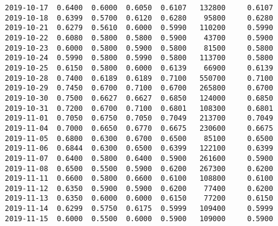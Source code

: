 \documentclass[11pt]{article}
\begin{document}
\begin{Verbatim}[commandchars=\\\{\}]
2019-10-17  0.6400  0.6000  0.6050  0.6107   132800     0.6107
2019-10-18  0.6399  0.5700  0.6120  0.6280    95800     0.6280
2019-10-21  0.6279  0.5610  0.6000  0.5990   110200     0.5990
2019-10-22  0.6080  0.5800  0.5800  0.5900    43700     0.5900
2019-10-23  0.6000  0.5800  0.5900  0.5800    81500     0.5800
2019-10-24  0.5990  0.5800  0.5990  0.5800   113700     0.5800
2019-10-25  0.6150  0.5800  0.6000  0.6139    66900     0.6139
2019-10-28  0.7400  0.6189  0.6189  0.7100   550700     0.7100
2019-10-29  0.7450  0.6700  0.7100  0.6700   265800     0.6700
2019-10-30  0.7500  0.6627  0.6627  0.6850   124000     0.6850
2019-10-31  0.7200  0.6700  0.7100  0.6801   108300     0.6801
2019-11-01  0.7050  0.6750  0.7050  0.7049   213700     0.7049
2019-11-04  0.7000  0.6650  0.6770  0.6675   230600     0.6675
2019-11-05  0.6800  0.6300  0.6700  0.6500    85100     0.6500
2019-11-06  0.6844  0.6300  0.6500  0.6399   122100     0.6399
2019-11-07  0.6400  0.5800  0.6400  0.5900   261600     0.5900
2019-11-08  0.6500  0.5500  0.5900  0.6200   267300     0.6200
2019-11-11  0.6600  0.5800  0.6600  0.6100   108800     0.6100
2019-11-12  0.6350  0.5900  0.5900  0.6200    77400     0.6200
2019-11-13  0.6350  0.6000  0.6000  0.6150    77200     0.6150
2019-11-14  0.6299  0.5750  0.6175  0.5999   109400     0.5999
2019-11-15  0.6000  0.5500  0.6000  0.5900   109000     0.5900


\end{Verbatim}
\end{document}
